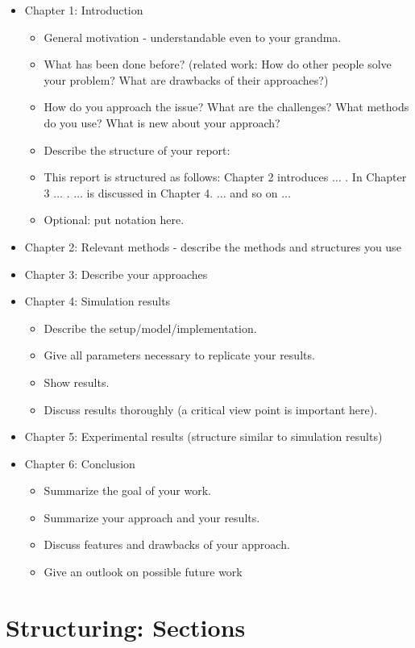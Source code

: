 \begin{itemize}
	\item Chapter 1: Introduction
	\begin{itemize}
			\item General motivation - understandable even to your grandma.
			\item What has been done before? (related work: How do other people solve your problem? What are drawbacks of their approaches?)
			\item How do you approach the issue? What are the challenges? What methods do you use? What is new about your approach?
			\item Describe the structure of your report: 
			\item This report is structured as follows: Chapter 2 introduces $\ldots$ . In Chapter 3 $\ldots$ . $\ldots$ is discussed in Chapter 4. $\ldots$ and so on $\ldots$
			\item Optional: put notation here.
	\end{itemize}
	\item Chapter 2: Relevant methods - describe the methods and structures you use
	\item Chapter 3: Describe your approaches
	\item Chapter 4: Simulation results
	\begin{itemize}
			\item Describe the setup/model/implementation.
			\item Give all parameters necessary to replicate your results.
			\item Show results.
			\item Discuss results thoroughly (a critical view point is important here).		
	\end{itemize}
	\item Chapter 5: Experimental results (structure similar to simulation results)
	\item Chapter 6: Conclusion
	\begin{itemize}
			\item Summarize the goal of your work.
			\item Summarize your approach and your results.
			\item Discuss features and drawbacks of your approach.
			\item Give an outlook on possible future work	
	\end{itemize}
\end{itemize}

\section{Structuring: Sections}

